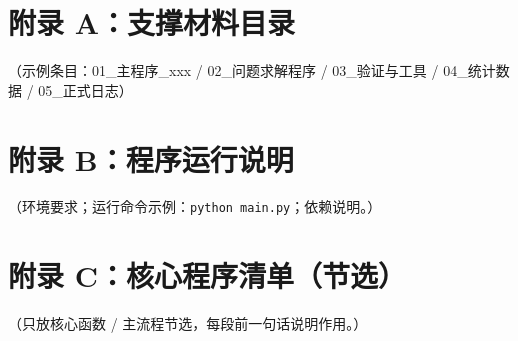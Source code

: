 
\section*{附录 A：支撑材料目录}

（示例条目：01_主程序_xxx / 02_问题求解程序 / 03_验证与工具 / 04_统计数据 / 05_正式日志）

\section*{附录 B：程序运行说明}

（环境要求；运行命令示例：\texttt{python main.py}；依赖说明。）

\section*{附录 C：核心程序清单（节选）}

（只放核心函数 / 主流程节选，每段前一句话说明作用。）

